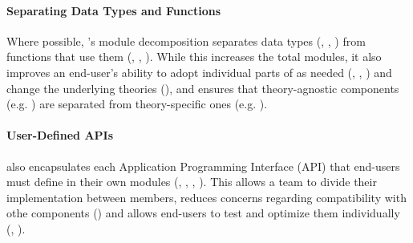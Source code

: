 \paragraph{Separating Data Types and Functions}
Where possible, \progname{}'s module decomposition separates data types
(, , ) from functions that
use them (, , ). While this
increases the total modules, it also improves an end-user's ability to adopt
individual parts of \progname{} as needed (,
, ) and change the underlying theories
(), and ensures that theory-agnostic components (e.g.
) are separated from theory-specific ones (e.g.
).

\paragraph{User-Defined APIs}
\progname{} also encapsulates each Application Programming Interface (API) that
end-users must define in their own modules (, ,
, ). This allows a team to divide their
implementation between members, reduces concerns regarding compatibility with
othe \progname{} components () and allows end-users to test and
optimize them individually (, ).